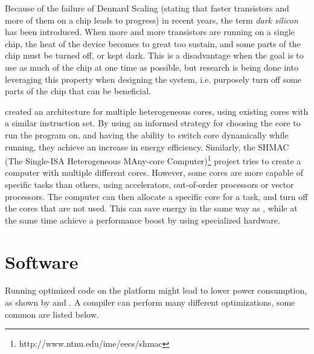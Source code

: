 Because of the failure of Dennard Scaling (stating that faster transistors and more of them on a chip leads to progress) in recent years, the term \emph{dark silicon} has been introduced. 
When more and more transistors are running on a single chip, the heat of the device becomes to great too sustain, and some parts of the chip must be turned off, or kept dark.
This is a disadvantage when the goal is to use as much of the chip at one time as possible, but research is being done into leveraging this property when designing the system, i.e. purposely turn off some parts of the chip that can be beneficial. \citep{Taylor:2012:DSU:2228360.2228567}

\citet{kumar2003} created an architecture for multiple heterogeneous cores, using existing cores with a similar instruction set.
By using an informed strategy for choosing the core to run the program on, and having the ability to switch core dynamically while running, they achieve an increase in energy efficiency.
Similarly, the SHMAC (The Single-ISA Heterogeneous MAny-core Computer)\footnote{http://www.ntnu.edu/ime/eecs/shmac} project tries to create a computer with multiple different cores.
However, some cores are more capable of specific tasks than others, using accelerators, out-of-order processors or vector processors.
The computer can then allocate a specific core for a task, and turn off the cores that are not used. 
This can save energy in the same way as \citet{kumar2003}, while at the same time achieve a performance boost by using specialized hardware. \citep{jahreshmac}

\section{Software}
Running optimized code on the platform might lead to lower power consumption, as shown by \citet{kavvadias04} and \citet{valluri01}. 
A compiler can perform many different optimizations, some common are listed below. \citep[chap. 9]{dragon}

